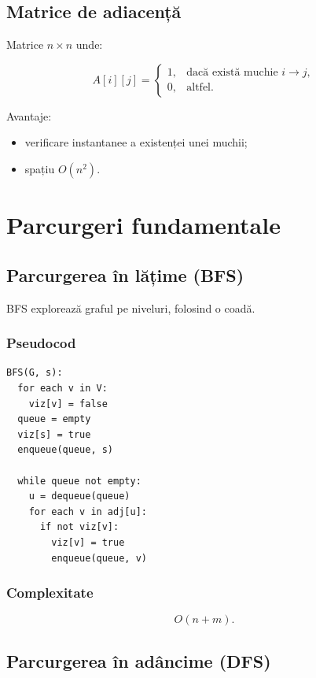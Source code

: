 \documentclass[12pt]{article}
\begin{document}
\subsection{Matrice de adiacență}

Matrice $n \times n$ unde:


\[
A[i][j] = 
\begin{cases}
1, & \text{dacă există muchie } i \to j,\\
0, & \text{altfel}.
\end{cases}
\]



Avantaje:
\begin{itemize}
    \item verificare instantanee a existenței unei muchii;
    \item spațiu $O(n^2)$.
\end{itemize}

\section{Parcurgeri fundamentale}

\subsection{Parcurgerea în lățime (BFS)}

BFS explorează graful pe niveluri, folosind o coadă.

\subsubsection*{Pseudocod}

\begin{verbatim}
BFS(G, s):
  for each v in V:
    viz[v] = false
  queue = empty
  viz[s] = true
  enqueue(queue, s)

  while queue not empty:
    u = dequeue(queue)
    for each v in adj[u]:
      if not viz[v]:
        viz[v] = true
        enqueue(queue, v)
\end{verbatim}

\subsubsection*{Complexitate}



\[
O(n + m).
\]



\subsection{Parcurgerea în adâncime (DFS)}
\end{document}
